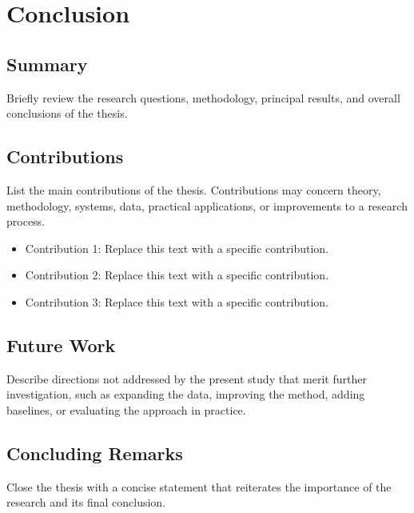 \chapter{Conclusion}

\section{Summary}

Briefly review the research questions, methodology, principal results, and overall conclusions of the thesis.

\section{Contributions}

List the main contributions of the thesis. Contributions may concern theory, methodology, systems, data, practical applications, or improvements to a research process.

\begin{itemize}
  \item Contribution 1: Replace this text with a specific contribution.
  \item Contribution 2: Replace this text with a specific contribution.
  \item Contribution 3: Replace this text with a specific contribution.
\end{itemize}

\section{Future Work}

Describe directions not addressed by the present study that merit further investigation, such as expanding the data, improving the method, adding baselines, or evaluating the approach in practice.

\section{Concluding Remarks}

Close the thesis with a concise statement that reiterates the importance of the research and its final conclusion.
